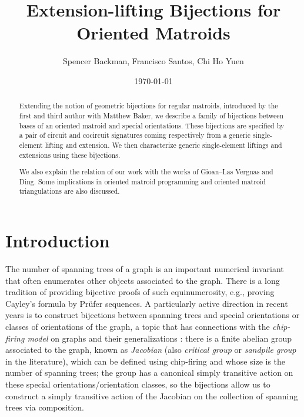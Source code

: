 \documentclass[12pt]{amsart}
\title[Extension-lifting Bijections for Oriented Matroids]{Extension-lifting Bijections for Oriented Matroids}
\author{Spencer Backman, Francisco Santos, Chi Ho Yuen}
\date{\today}  %
\numberwithin{equation}{section}
\theoremstyle{definition}
\newcommand{\Chiho}[1]{\todo[size=\tiny,inline,color=green!30]{#1 \\ \hfill --- Ch.}}
\begin{document}
\begin{abstract}
Extending the notion of geometric bijections for regular matroids, introduced by the first and third author with Matthew Baker, we describe a family of bijections between bases of an oriented matroid and special orientations.
These bijections are specified by a pair of circuit and cocircuit signatures coming respectively from a generic single-element lifting and extension.
We then characterize generic single-element liftings and extensions using these bijections.


We also explain the relation of our work with the works of Gioan--Las Vergnas and Ding. Some implications in oriented matroid programming and oriented matroid triangulations are also discussed.
\end{abstract}

\maketitle

\tableofcontents


\section{Introduction}

The number of spanning trees of a graph is an important numerical invariant that often enumerates other objects associated to the graph.
There is a long tradition of providing bijective proofs of such equinumerosity, e.g., proving Cayley's formula by Pr\"{u}fer sequences.
A particularly active direction in recent years is to construct bijections between spanning trees and special orientations or classes of orientations of the graph, a topic that has connections with the {\em chip-firing model} on graphs and their generalizations \cite{Bac_RR,Bac_PO}: there is a finite abelian group associated to the graph, known as {\em Jacobian} (also {\em critical group} or {\em sandpile group} in the literature), which can be defined using chip-firing and whose size is the number of spanning trees; the group has a canonical simply transitive action on these special orientations/orientation classes, so the bijections allow us to construct a simply transitive action of the Jacobian on the collection of spanning trees via composition.
\end{document}
